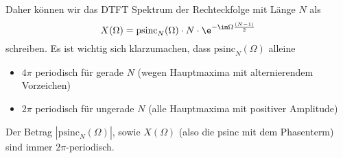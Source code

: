 \begin{ExCalc}
Daher können wir das DTFT Spektrum der Rechteckfolge mit Länge $N$ als
\begin{equation}
X(\Omega)=
\mathrm{psinc}_N(\Omega) \cdot N \cdot \e^{-\im\Omega\frac{(N-1)}{2}}
\end{equation}
schreiben.
%
Es ist wichtig sich klarzumachen, dass $\mathrm{psinc}_N(\Omega)$ alleine
\begin{itemize}
\item $4\pi$ periodisch für gerade $N$ (wegen Hauptmaxima mit alternierendem Vorzeichen)
\item $2\pi$ periodisch für ungerade $N$ (alle Hauptmaxima mit positiver Amplitude)
\end{itemize}
Der Betrag $|\mathrm{psinc}_N(\Omega)|$, sowie $X(\Omega)$ (also die psinc mit dem Phasenterm)
sind immer $2\pi$-periodisch.
\end{ExCalc}


